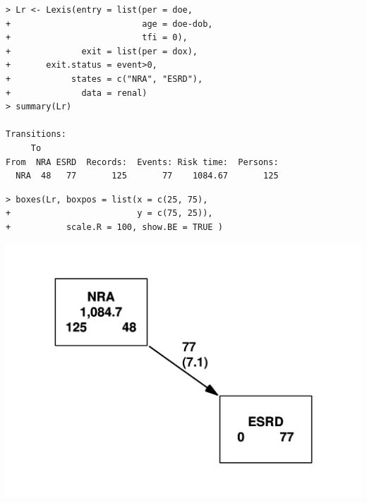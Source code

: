 \begin{frame}[fragile]
\renewcommand{\baselinestretch}{0.8}
\footnotesize
\begin{verbatim}
> Lr <- Lexis(entry = list(per = doe,
+                          age = doe-dob,
+                          tfi = 0),
+              exit = list(per = dox),
+       exit.status = event>0,
+            states = c("NRA", "ESRD"),
+              data = renal)
> summary(Lr)

Transitions:
     To
From  NRA ESRD  Records:  Events: Risk time:  Persons:
  NRA  48   77       125       77    1084.67       125
\end{verbatim}
\normalsize
\renewcommand{\baselinestretch}{1.0}
\end{frame}

\begin{frame}[fragile]
\renewcommand{\baselinestretch}{0.8}
\footnotesize
\begin{verbatim}
> boxes(Lr, boxpos = list(x = c(25, 75),
+                         y = c(75, 25)),
+           scale.R = 100, show.BE = TRUE )
\end{verbatim}
\normalsize
\renewcommand{\baselinestretch}{1.0}
\begin{center}
\includegraphics[height=0.7\textheight,keepaspectratio]{./NRA-mort}
\end{center}
\end{frame}


